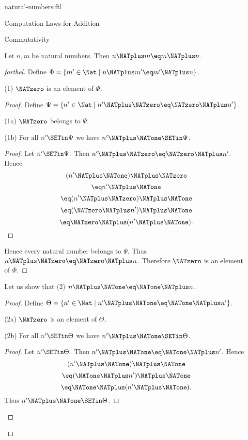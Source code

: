 \documentclass{stex}
\begin{document}
\begin{smodule}{natural-numbers.ftl}
\begin{sfragment}{Computation Laws for Addition}
  \begin{sfragment}{Commutativity}
    \begin{proposition}[forthel,id=ARITHMETIC_03_4029553232052224]
      Let $n, m$ be natural numbers.
      Then $n \NATplus m \eq m \NATplus n$.
    \end{proposition}
    \begin{proof}[forthel]
      Define $\Phi = \{ m' \in \Nat \mid n \NATplus m' \eq m' \NATplus n \}$.

      (1) $\NATzero$ is an element of $\Phi$.
      \begin{proof}
        Define $\Psi = \{ n' \in \Nat \mid n' \NATplus \NATzero \eq \NATzero \NATplus n' \}$.

        (1a) $\NATzero$ belongs to $\Psi$.

        (1b) For all $n' \SETin \Psi$ we have $n' \NATplus \NATone \SETin \Psi$.
        \begin{proof}
          Let $n' \SETin \Psi$.
          Then $n' \NATplus \NATzero \eq \NATzero \NATplus n'$.
          Hence
          \[  (n' \NATplus \NATone) \NATplus \NATzero        \]
          \[    \eq n' \NATplus \NATone          \]
          \[    \eq (n' \NATplus \NATzero) \NATplus \NATone    \]
          \[    \eq (\NATzero \NATplus n') \NATplus \NATone    \]
          \[    \eq \NATzero \NATplus (n' \NATplus \NATone).   \]
        \end{proof}

        Hence every natural number belongs to $\Psi$.
        Thus $n \NATplus \NATzero \eq \NATzero \NATplus n$.
        Therefore $\NATzero$ is an element of $\Phi$.
      \end{proof}

      Let us show that (2) $n \NATplus \NATone \eq \NATone \NATplus n$.
      \begin{proof}
        Define $\Theta = \{ n' \in \Nat \mid n' \NATplus \NATone \eq \NATone \NATplus n' \}$.

        (2a) $\NATzero$ is an element of $\Theta$.

        (2b) For all $n' \SETin \Theta$ we have $n' \NATplus \NATone \SETin \Theta$.
        \begin{proof}
          Let $n' \SETin \Theta$.
          Then $n' \NATplus \NATone \eq \NATone \NATplus n'$.
          Hence
          \[  (n' \NATplus \NATone) \NATplus \NATone        \]
          \[    \eq (\NATone \NATplus n') \NATplus \NATone    \]
          \[    \eq \NATone \NATplus (n' \NATplus \NATone).   \]
          Thus $n' \NATplus \NATone \SETin \Theta$.
        \end{proof}


\end{proof}
\end{proof}
\end{sfragment}
\end{sfragment}
\end{smodule}
\end{document}
